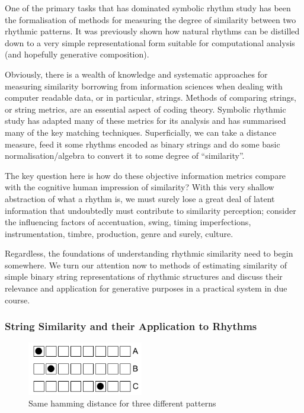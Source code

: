 One of the primary tasks that has dominated symbolic rhythm study has been the formalisation of methods for measuring the degree of similarity between two rhythmic patterns. It was previously shown how natural rhythms can be distilled down to a very simple representational form suitable for computational analysis (and hopefully generative composition).

Obviously, there is a wealth of knowledge and systematic approaches for measuring similarity borrowing from information sciences when dealing with computer readable data, or in particular, strings. Methods of comparing strings, or string metrics, are an essential aspect of coding theory. Symbolic rhythmic study has adapted many of these metrics for its analysis and \cite{Toussaint2004} has summarised many of the key matching techniques. Superficially, we can take a distance measure, feed it some rhythms encoded as binary strings and do some basic normalisation/algebra to convert it to some degree of “similarity”.

The key question here is how do these objective information metrics compare with the cognitive human impression of similarity? With this very shallow abstraction of what a rhythm is, we must surely lose a great deal of latent information that undoubtedly must contribute to similarity perception; consider the influencing factors of accentuation, swing, timing imperfections, instrumentation, timbre, production, genre and surely, culture. 

Regardless, the foundations of understanding rhythmic similarity need to begin somewhere. We turn our attention now to methods of estimating similarity of simple binary string representations of rhythmic structures and discuss their relevance and application for generative purposes in a practical system in due course.

\subsubsection{String Similarity and their Application to Rhythms}

\label{sec:distance_measures}

\begin{figure}
	\begin{center}
		\includegraphics[width=0.45\textwidth]{ch03_symbolic/figures/hamming_comparison.png}
	\end{center}
	\caption[Hamming distance comparison for three different patterns ]{Same hamming distance for three different patterns}
	\label{fig:hamming_comparison}
\end{figure}

